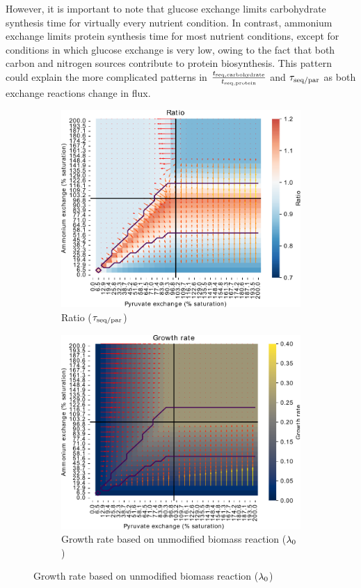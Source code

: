 However, it is important to note that glucose exchange limits carbohydrate synthesis time for virtually every nutrient condition.
In contrast, ammonium exchange limits protein synthesis time for most nutrient conditions, except for conditions in which glucose exchange is very low, owing to the fact that both carbon and nitrogen sources contribute to protein biosynthesis.
This pattern could explain the more complicated patterns in $\frac{t_{\mathrm{seq},\mathrm{carbohydrate}}}{t_{\mathrm{seq},\mathrm{protein}}}$ and $\tau_{\mathrm{seq}/\mathrm{par}}$ as both exchange reactions change in flux.

\begin{figure}
  \centering
  \begin{subfigure}[t]{0.45\textwidth}
  \centering
    \includegraphics[width=\linewidth]{ec_grid_pyr_amm_ratio}
    \caption{
      Ratio ($\tau_{\mathrm{seq}/\mathrm{par}}$)
    }
    \label{fig:model-grid-pyr-ratio}
  \end{subfigure}%
  \begin{subfigure}[t]{0.45\textwidth}
  \centering
    \includegraphics[width=\linewidth]{ec_grid_pyr_amm_gr}
    \caption{
      Growth rate based on unmodified biomass reaction ($\lambda_{0}$)
    }
    \label{fig:model-grid-pyr-growthrate}
  \end{subfigure}


\end{figure}
